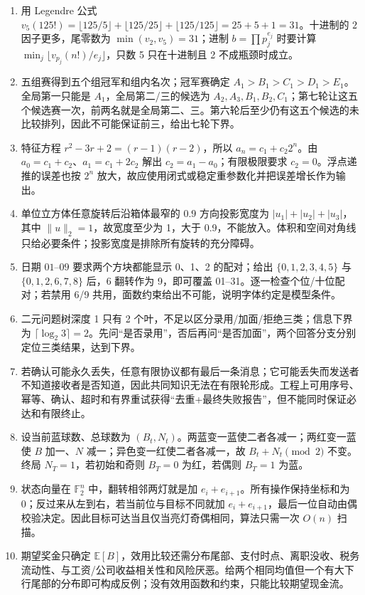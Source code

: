 \begin{enumerate}[leftmargin=*]
  \item 用 Legendre 公式 $v_5(125!)=\lfloor125/5\rfloor+\lfloor125/25\rfloor+\lfloor125/125\rfloor=25+5+1=31$。十进制的 $2$ 因子更多，尾零数为 $\min(v_2,v_5)=31$；进制 $b=\prod p_j^{e_j}$ 时要计算 $\min_j\lfloor v_{p_j}(n!)/e_j\rfloor$，只数 5 只在十进制且 2 不成瓶颈时成立。
  \item 五组赛得到五个组冠军和组内名次；冠军赛确定 $A_1>B_1>C_1>D_1>E_1$。全局第一只能是 $A_1$，全局第二/三的候选为 $A_2,A_3,B_1,B_2,C_1$；第七轮让这五个候选赛一次，前两名就是全局第二、三。第六轮后至少仍有这五个候选的未比较排列，因此不可能保证前三，给出七轮下界。
  \item 特征方程 $r^2-3r+2=(r-1)(r-2)$，所以 $a_n=c_1+c_2 2^n$。由 $a_0=c_1+c_2$、$a_1=c_1+2c_2$ 解出 $c_2=a_1-a_0$；有限极限要求 $c_2=0$。浮点递推的误差也按 $2^n$ 放大，故应使用闭式或稳定重参数化并把误差增长作为输出。
  \item 单位立方体任意旋转后沿箱体最窄的 $0.9$ 方向投影宽度为 $|u_1|+|u_2|+|u_3|$，其中 $\|u\|_2=1$，故宽度至少为 1，大于 0.9，不能放入。体积和空间对角线只给必要条件；投影宽度是排除所有旋转的充分障碍。
  \item 日期 $01$--$09$ 要求两个方块都能显示 0、1、2 的配对；给出 $\{0,1,2,3,4,5\}$ 与 $\{0,1,2,6,7,8\}$ 后，6 翻转作为 9，即可覆盖 01--31。逐一检查个位/十位配对；若禁用 6/9 共用，面数约束给出不可能，说明字体约定是模型条件。
  \item 二元问题树深度 1 只有 2 个叶，不足以区分录用/加面/拒绝三类；信息下界为 $\lceil\log_2 3\rceil=2$。先问“是否录用”，否后再问“是否加面”，两个回答分支分别定位三类结果，达到下界。
  \item 若确认可能永久丢失，任意有限协议都有最后一条消息；它可能丢失而发送者不知道接收者是否知道，因此共同知识无法在有限轮形成。工程上可用序号、幂等、确认、超时和有界重试获得“去重+最终失败报告”，但不能同时保证必达和有限终止。
  \item 设当前蓝球数、总球数为 $(B_t,N_t)$。两蓝变一蓝使二者各减一；两红变一蓝使 $B$ 加一、$N$ 减一；异色变一红使二者各减一，故 $B_t+N_t\pmod2$ 不变。终局 $N_T=1$，若初始和奇则 $B_T=0$ 为红，若偶则 $B_T=1$ 为蓝。
  \item 状态向量在 $\mathbb F_2^n$ 中，翻转相邻两灯就是加 $e_i+e_{i+1}$。所有操作保持坐标和为 0；反过来从左到右，若当前位与目标不同就加 $e_i+e_{i+1}$，最后一位自动由偶校验决定。因此目标可达当且仅当亮灯奇偶相同，算法只需一次 $O(n)$ 扫描。
  \item 期望奖金只确定 $\mathbb E[B]$，效用比较还需分布尾部、支付时点、离职没收、税务流动性、与工资/公司收益相关性和风险厌恶。给两个相同均值但一个有大下行尾部的分布即可构成反例；没有效用函数和约束，只能比较期望现金流。

\end{enumerate}

